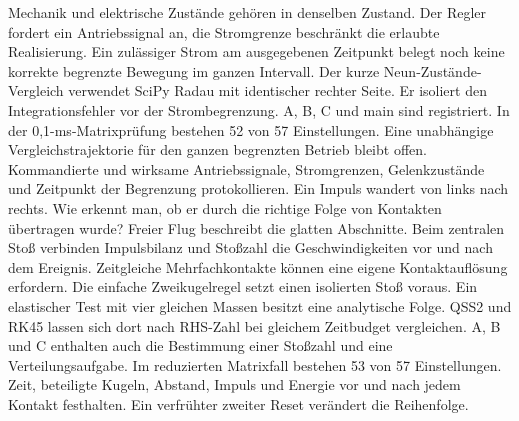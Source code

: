 Mechanik und elektrische Zustände gehören in denselben Zustand. Der Regler fordert ein Antriebssignal an, die Stromgrenze beschränkt die erlaubte Realisierung.
Ein zulässiger Strom am ausgegebenen Zeitpunkt belegt noch keine korrekte begrenzte Bewegung im ganzen Intervall.
Der kurze Neun-Zustände-Vergleich verwendet SciPy Radau mit identischer rechter Seite. Er isoliert den Integrationsfehler vor der Strombegrenzung.
A, B, C und main sind registriert. In der 0,1-ms-Matrixprüfung bestehen 52 von 57 Einstellungen. Eine unabhängige Vergleichstrajektorie für den ganzen begrenzten Betrieb bleibt offen.
Kommandierte und wirksame Antriebssignale, Stromgrenzen, Gelenkzustände und Zeitpunkt der Begrenzung protokollieren.
Ein Impuls wandert von links nach rechts. Wie erkennt man, ob er durch die richtige Folge von Kontakten übertragen wurde?
Freier Flug beschreibt die glatten Abschnitte. Beim zentralen Stoß verbinden Impulsbilanz und Stoßzahl die Geschwindigkeiten vor und nach dem Ereignis.
Zeitgleiche Mehrfachkontakte können eine eigene Kontaktauflösung erfordern. Die einfache Zweikugelregel setzt einen isolierten Stoß voraus.
Ein elastischer Test mit vier gleichen Massen besitzt eine analytische Folge. QSS2 und RK45 lassen sich dort nach RHS-Zahl bei gleichem Zeitbudget vergleichen.
A, B und C enthalten auch die Bestimmung einer Stoßzahl und eine Verteilungsaufgabe. Im reduzierten Matrixfall bestehen 53 von 57 Einstellungen.
Zeit, beteiligte Kugeln, Abstand, Impuls und Energie vor und nach jedem Kontakt festhalten. Ein verfrühter zweiter Reset verändert die Reihenfolge.
